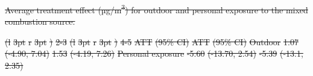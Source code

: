 \documentclass[
  letterpaper,
  DIV=11,
  numbers=noendperiod]{scrartcl}
\makeatletter
\renewenvironment{table}%
   {\renewcommand\familydefault\sfdefault
    \@float{table}}
   {\end@float}
\providecommand{\DIFadd}[1]{{\protect\color{blue}\underline{#1}}} %
\providecommand{\DIFdel}[1]{{\protect\color{red}\sout{#1}}}                      %
\providecommand{\DIFdelbegin}{} %
\providecommand{\DIFaddFL}[1]{\DIFadd{#1}} %
\providecommand{\DIFdelFL}[1]{\DIFdel{#1}} %
\providecommand{\DIFaddbeginFL}{} %
\providecommand{\DIFaddendFL}{} %
\providecommand{\DIFdelbeginFL}{} %
\providecommand{\DIFdelendFL}{} %
\newcommand{\DIFscaledelfig}{0.5}
\newlength{\DIFdelgraphicswidth} %
\newlength{\DIFdelgraphicsheight} %
\newcommand{\DIFaddincludegraphics}[2][]{{\color{blue}\fbox{\DIFOincludegraphics[#1]{#2}}}} %
\newcommand{\DIFdelincludegraphics}[2][]{%
\sbox{\DIFdelgraphicsbox}{\DIFOincludegraphics[#1]{#2}}%
\settoboxwidth{\DIFdelgraphicswidth}{\DIFdelgraphicsbox} %
\settoboxtotalheight{\DIFdelgraphicsheight}{\DIFdelgraphicsbox} %
\scalebox{\DIFscaledelfig}{%
\parbox[b]{\DIFdelgraphicswidth}{\usebox{\DIFdelgraphicsbox}\\[-\baselineskip] \rule{\DIFdelgraphicswidth}{0em}}\llap{\resizebox{\DIFdelgraphicswidth}{\DIFdelgraphicsheight}{%
\setlength{\unitlength}{\DIFdelgraphicswidth}%
\begin{picture}(1,1)%
\thicklines\linethickness{2pt} %
{\color[rgb]{1,0,0}\put(0,0){\framebox(1,1){}}}%
{\color[rgb]{1,0,0}\put(0,0){\line( 1,1){1}}}%
{\color[rgb]{1,0,0}\put(0,1){\line(1,-1){1}}}%
\end{picture}%
}\hspace*{3pt}}} %
} %
\DeclareRobustCommand{\DIFdelbegin}{\DIFOdelbegin \let\includegraphics\DIFdelincludegraphics} %
\DeclareRobustCommand{\DIFaddbeginFL}{\DIFOaddbeginFL \let\includegraphics\DIFaddincludegraphics} %
\DeclareRobustCommand{\DIFaddendFL}{\DIFOaddendFL \let\includegraphics\DIFOincludegraphics} %
\DeclareRobustCommand{\DIFdelbeginFL}{\DIFOdelbeginFL \let\includegraphics\DIFdelincludegraphics} %
\DeclareRobustCommand{\DIFdelendFL}{\DIFOaddendFL \let\includegraphics\DIFOincludegraphics} %
\makeatother
\begin{document}
\DIFdelbegin %
{%
\DIFdelFL{Average treatment effect (µg/m\textsuperscript{3}) for outdoor and
personal exposure to the mixed combustion source. }}%
\DIFdelendFL \DIFaddbeginFL \begin{table}
\DIFaddendFL 

\DIFdelbeginFL %
\DIFdelFL{(l}%
\DIFdelFL{3pt}%
\DIFdelFL{r}%
\DIFdelFL{3pt}%
\DIFdelFL{)}%
\DIFdelFL{2-3}%
\DIFdelFL{(l}%
\DIFdelFL{3pt}%
\DIFdelFL{r}%
\DIFdelFL{3pt}%
\DIFdelFL{)}%
\DIFdelFL{4-5}%
\DIFdelFL{ATT }%
\DIFdelFL{(95\% CI) }%
\DIFdelFL{ATT }%
\DIFdelFL{(95\% CI)}%
\DIFdelFL{Outdoor }%
\DIFdelFL{1.07 }%
\DIFdelFL{(-4.90, 7.04) }%
\DIFdelFL{1.53 }%
\DIFdelFL{(-4.19, 7.26)}%
\DIFdelFL{Personal exposure }%
\DIFdelFL{-5.60 }%
\DIFdelFL{(-13.70, 2.54) }%
\DIFdelFL{-5.39 }%
\DIFdelFL{(-13.1, 2.35)}%
\DIFdelendFL \DIFaddbeginFL \caption{\label{tbl-source-did}\DIFaddFL{Average treatment effect
(µg/m\textsuperscript{3}) for outdoor and personal exposure to the mixed
combustion source.}}


\end{table}
\end{document}
